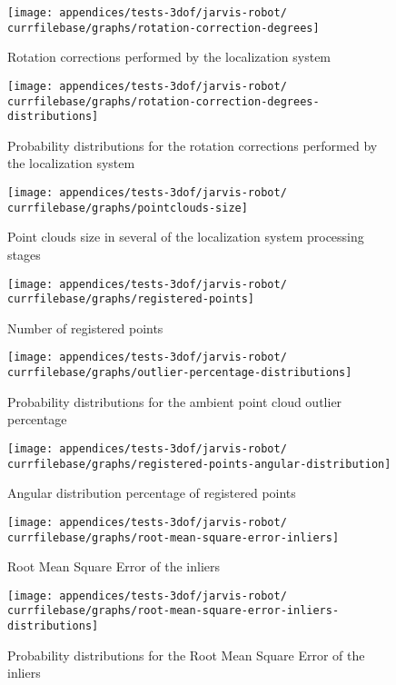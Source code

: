 \begin{figure}[H]
	\centering
	\texttt{[image: appendices/tests-3dof/jarvis-robot/\\currfilebase/graphs/rotation-correction-degrees]}
	\caption{Rotation corrections performed by the localization system}
\end{figure}

\begin{figure}[H]
	\centering
	\texttt{[image: appendices/tests-3dof/jarvis-robot/\\currfilebase/graphs/rotation-correction-degrees-distributions]}
	\caption{Probability distributions for the rotation corrections performed by the localization system}
\end{figure}


\begin{figure}[H]
	\centering
	\texttt{[image: appendices/tests-3dof/jarvis-robot/\\currfilebase/graphs/pointclouds-size]}
	\caption{Point clouds size in several of the localization system processing stages}
\end{figure}

\begin{figure}[H]
	\centering
	\texttt{[image: appendices/tests-3dof/jarvis-robot/\\currfilebase/graphs/registered-points]}
	\caption{Number of registered points}
\end{figure}

\begin{figure}[H]
	\centering
	\texttt{[image: appendices/tests-3dof/jarvis-robot/\\currfilebase/graphs/outlier-percentage-distributions]}
	\caption{Probability distributions for the ambient point cloud outlier percentage}
\end{figure}


\begin{figure}[H]
	\centering
	\texttt{[image: appendices/tests-3dof/jarvis-robot/\\currfilebase/graphs/registered-points-angular-distribution]}
	\caption{Angular distribution percentage of registered points}
\end{figure}

\begin{figure}[H]
	\centering
	\texttt{[image: appendices/tests-3dof/jarvis-robot/\\currfilebase/graphs/root-mean-square-error-inliers]}
	\caption{Root Mean Square Error of the inliers}
\end{figure}

\begin{figure}[H]
	\centering
	\texttt{[image: appendices/tests-3dof/jarvis-robot/\\currfilebase/graphs/root-mean-square-error-inliers-distributions]}
	\caption{Probability distributions for the Root Mean Square Error of the inliers}
\end{figure}


